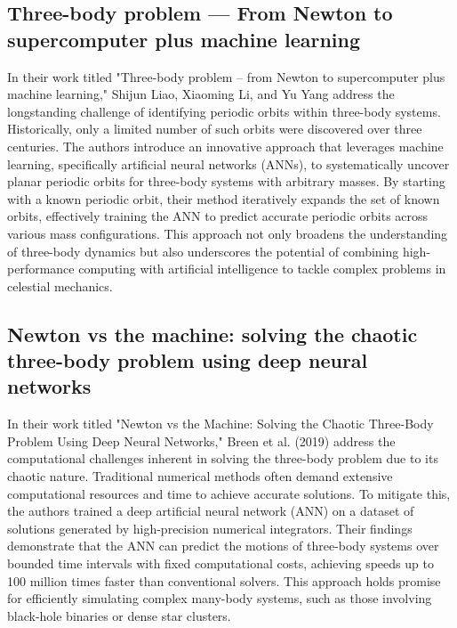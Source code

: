 \documentclass[draft]{agujournal2019}
\begin{document}
\subsection{Three-body problem — From Newton to supercomputer plus machine learning}
In their work titled "Three-body problem -- from Newton to supercomputer plus machine learning," Shijun Liao, Xiaoming Li, and Yu Yang address the longstanding challenge of identifying periodic orbits within three-body systems. \cite{Liao_2022} Historically, only a limited number of such orbits were discovered over three centuries. The authors introduce an innovative approach that leverages machine learning, specifically artificial neural networks (ANNs), to systematically uncover planar periodic orbits for three-body systems with arbitrary masses. By starting with a known periodic orbit, their method iteratively expands the set of known orbits, effectively training the ANN to predict accurate periodic orbits across various mass configurations. This approach not only broadens the understanding of three-body dynamics but also underscores the potential of combining high-performance computing with artificial intelligence to tackle complex problems in celestial mechanics.
\subsection{Newton vs the machine: solving the chaotic three-body problem using deep neural networks}
In their work titled "Newton vs the Machine: Solving the Chaotic Three-Body Problem Using Deep Neural Networks," Breen et al. (2019) address the computational challenges inherent in solving the three-body problem due to its chaotic nature. Traditional numerical methods often demand extensive computational resources and time to achieve accurate solutions. To mitigate this, the authors trained a deep artificial neural network (ANN) on a dataset of solutions generated by high-precision numerical integrators. Their findings demonstrate that the ANN can predict the motions of three-body systems over bounded time intervals with fixed computational costs, achieving speeds up to 100 million times faster than conventional solvers. This approach holds promise for efficiently simulating complex many-body systems, such as those involving black-hole binaries or dense star clusters.
\end{document}
